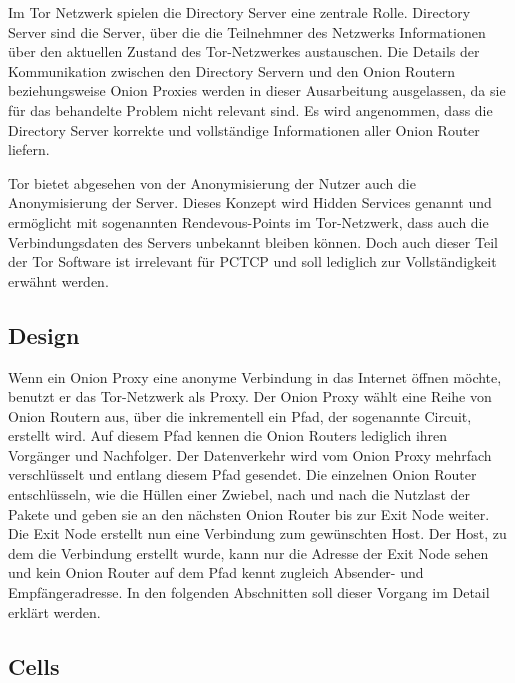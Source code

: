 \documentclass[fleqn,envcountsame,runningheads,10pt,a4paper]{llncs}
\begin{document}
Im Tor Netzwerk spielen die Directory Server eine zentrale Rolle. Directory 
Server sind die Server, über die die Teilnehmner des Netzwerks Informationen 
über den aktuellen Zustand des Tor-Netzwerkes austauschen. Die Details 
der Kommunikation zwischen den Directory Servern und den Onion Routern 
beziehungsweise Onion Proxies werden in dieser Ausarbeitung ausgelassen, da sie 
für das behandelte Problem nicht relevant sind. Es wird angenommen, dass die 
Directory Server korrekte und vollständige Informationen aller Onion Router 
liefern.

Tor bietet abgesehen von der Anonymisierung der Nutzer auch die Anonymisierung 
der Server. Dieses Konzept wird Hidden Services genannt und ermöglicht mit 
sogenannten Rendevous-Points im Tor-Netzwerk, dass auch die 
Verbindungsdaten des Servers unbekannt bleiben können. Doch auch dieser Teil der 
Tor Software ist irrelevant für PCTCP und soll lediglich zur Vollständigkeit 
erwähnt werden.

\subsection{Design}

Wenn ein Onion Proxy eine anonyme Verbindung in das Internet öffnen möchte, 
benutzt er das Tor-Netzwerk als Proxy. Der Onion Proxy wählt eine Reihe 
von Onion Routern aus, über die inkrementell ein Pfad, der sogenannte Circuit, 
erstellt wird. Auf diesem Pfad kennen die Onion Routers lediglich ihren 
Vorgänger und Nachfolger. Der Datenverkehr wird vom Onion Proxy mehrfach 
verschlüsselt und entlang diesem Pfad gesendet. Die einzelnen Onion Router 
entschlüsseln, wie die Hüllen einer Zwiebel, nach und nach die Nutzlast der 
Pakete und geben sie an den nächsten Onion Router bis zur Exit Node weiter. Die 
Exit Node erstellt nun eine Verbindung zum gewünschten Host. Der Host, zu dem 
die Verbindung erstellt wurde, kann nur die Adresse der Exit Node sehen und kein 
Onion Router auf dem Pfad kennt zugleich Absender- und Empfängeradresse. In den 
folgenden Abschnitten soll dieser Vorgang im Detail erklärt werden.

\subsection{Cells}
\end{document}

